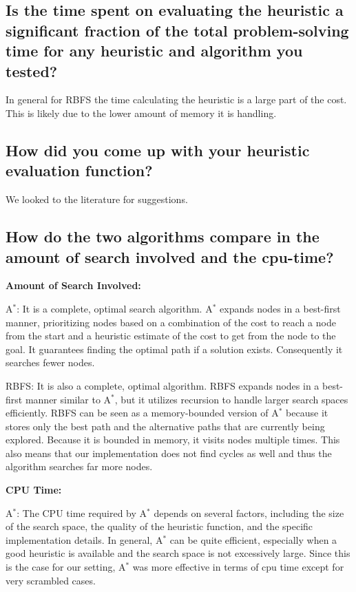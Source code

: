 \documentclass{article}
\begin{document}
\subsection{ Is the time spent on evaluating the heuristic a significant fraction of the total problem-solving time for any heuristic and algorithm you tested?} In general for RBFS the time calculating the heuristic is a large part of the cost. This is likely due to the lower amount of memory it is handling. 
\subsection{ How did you come up with your heuristic evaluation function?}

{We looked to the literature for suggestions. }

\subsection{ How do the two algorithms compare in the amount of search involved and the cpu-time?}

\textbf{Amount of Search Involved: }

 A$^*$: It is a complete, optimal search algorithm. A$^*$ expands nodes in a best-first manner, prioritizing nodes based on a combination of the cost to reach a node from the start and a heuristic estimate of the cost to get from the node to the goal. It guarantees finding the optimal path if a solution exists. Consequently it searches fewer nodes.

 RBFS: It is also a complete, optimal algorithm. RBFS expands nodes in a best-first manner similar to A$^*$, but it utilizes recursion to handle larger search spaces efficiently. RBFS can be seen as a memory-bounded version of A$^*$ because it stores only the best path and the alternative paths that are currently being explored. Because it is bounded in memory, it visits nodes multiple times. This also means that our implementation does not find cycles as well and thus the algorithm searches far more nodes.

\textbf{CPU Time:}

 A$^*$: The CPU time required by A$^*$ depends on several factors, including the size of the search space, the quality of the heuristic function, and the specific implementation details. In general, A$^*$ can be quite efficient, especially when a good heuristic is available and the search space is not excessively large. Since this is the case for our setting, A$^*$ was more effective in terms of cpu time except for very scrambled cases. 
\end{document}
